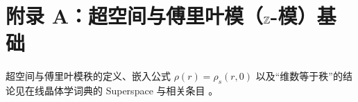 \section{附录 A：超空间与傅里叶模（\texorpdfstring{$\mathbb{Z}$}{Z}-模）基础}

超空间与傅里叶模秩的定义、嵌入公式 $\rho(r)=\rho_s(r,0)$ 以及“维数等于秩”的结论见在线晶体学词典的 Superspace 与相关条目 \cite{IUCRSuperspace}。

